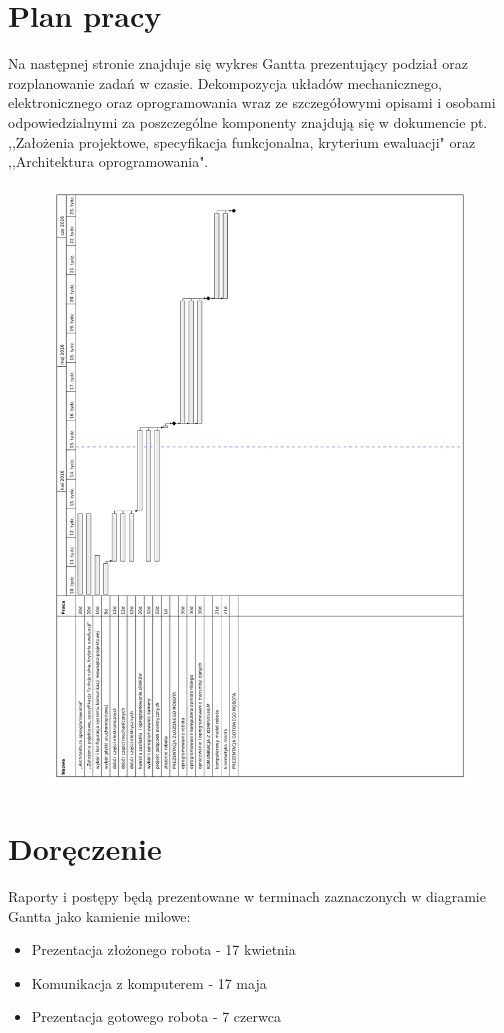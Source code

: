 \documentclass[a4paper]{article}
\begin{document}
\section{Plan pracy}
    Na następnej stronie znajduje się wykres Gantta prezentujący podział oraz rozplanowanie zadań w czasie. Dekompozycja układów mechanicznego, elektronicznego oraz oprogramowania wraz ze szczegółowymi opisami i osobami odpowiedzialnymi za poszczególne komponenty znajdują się w dokumencie pt. ,,Założenia projektowe, specyfikacja funkcjonalna, kryterium ewaluacji" oraz ,,Architektura oprogramowania".    
        \begin{figure}
            \centering
            \includegraphics[scale=0.7]{gantt-autko}
            \label{fig:gantt}
        \end{figure}
\newpage
\section{Doręczenie}
    Raporty i postępy będą prezentowane w terminach zaznaczonych w diagramie Gantta jako kamienie milowe:
    \begin{itemize}
        \item Prezentacja złożonego robota - 17 kwietnia
        \item Komunikacja z komputerem - 17 maja
        \item Prezentacja gotowego robota - 7 czerwca
    \end{itemize}
\end{document}
